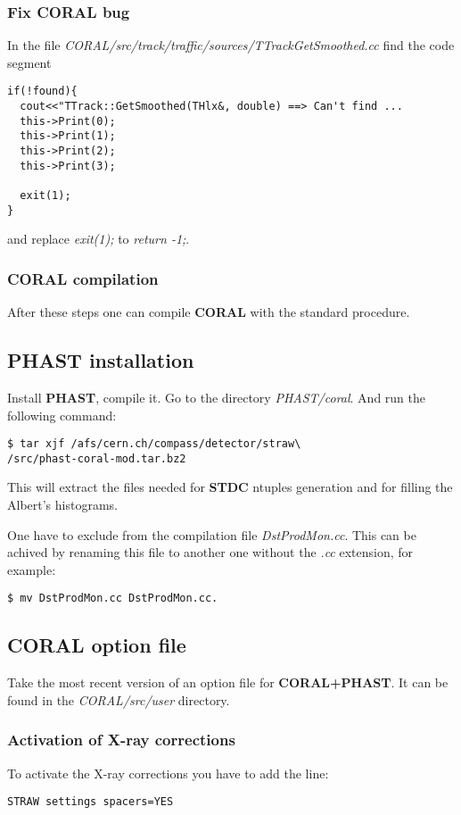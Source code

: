 \documentclass[a4paper,12pt]{article}
\begin{document}
\begin{enumerate}
\subsubsection{Fix CORAL bug}
In the file {\it CORAL/src/track/traffic/sources/TTrackGetSmoothed.cc}
find the code segment
\begin{verbatim}
if(!found){
  cout<<"TTrack::GetSmoothed(THlx&, double) ==> Can't find ...
  this->Print(0);
  this->Print(1);
  this->Print(2);
  this->Print(3);

  exit(1);
}
\end{verbatim}
and replace {\it exit(1);} to {\it return -1;}.

\subsubsection{CORAL compilation}
After these steps one can compile {\bf CORAL} with the standard procedure.

\subsection{{\bf PHAST} installation}
Install {\bf PHAST}, compile it. Go to the directory {\it PHAST/coral}.
And run the following command:
\begin{verbatim}
$ tar xjf /afs/cern.ch/compass/detector/straw\
/src/phast-coral-mod.tar.bz2
\end{verbatim}
This will extract the files needed for {\bf STDC} ntuples generation and
for filling the Albert's histograms.

One have to exclude from the compilation file {\it DstProdMon.cc}. This can be
achived by renaming this file to another one without the {\it .cc} extension,
for example:
\begin{verbatim}
$ mv DstProdMon.cc DstProdMon.cc.
\end{verbatim}

\subsection{CORAL option file}
Take the most recent version of an option file for {\bf CORAL+PHAST}.
It can be found in the {\it CORAL/src/user} directory.
\subsubsection{Activation of X-ray corrections}
To activate the X-ray corrections you have to add the line:
\begin{verbatim}
STRAW settings spacers=YES
\end{verbatim}


\end{enumerate}
\end{document}
